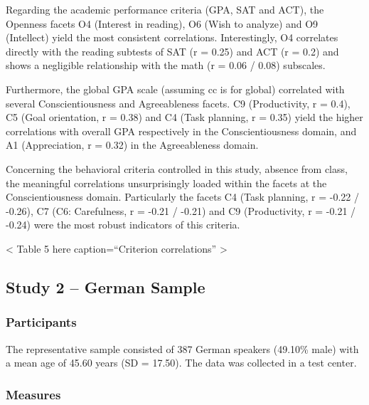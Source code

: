 \documentclass[,man,floatsintext]{apa6}
\theoremstyle{definition}
\theoremstyle{definition}
\theoremstyle{definition}
\theoremstyle{remark}
\begin{document}
Regarding the academic performance criteria (GPA, SAT and ACT), the
Openness facets O4 (Interest in reading), O6 (Wish to analyze) and O9
(Intellect) yield the most consistent correlations. Interestingly, O4
correlates directly with the reading subtests of SAT (r = 0.25) and ACT
(r = 0.2) and shows a negligible relationship with the math (r = 0.06 /
0.08) subscales.

Furthermore, the global GPA scale (assuming cc is for global) correlated
with several Conscientiousness and Agreeableness facets. C9
(Productivity, r = 0.4), C5 (Goal orientation, r = 0.38) and C4 (Task
planning, r = 0.35) yield the higher correlations with overall GPA
respectively in the Conscientiousness domain, and A1 (Appreciation, r =
0.32) in the Agreeableness domain.

Concerning the behavioral criteria controlled in this study, absence
from class, the meaningful correlations unsurprisingly loaded within the
facets at the Conscientiousness domain. Particularly the facets C4 (Task
planning, r = -0.22 / -0.26), C7 (C6: Carefulness, r = -0.21 / -0.21)
and C9 (Productivity, r = -0.21 / -0.24) were the most robust indicators
of this criteria.

\vspace{5mm}

\textless{} Table 5 here caption=\enquote{Criterion correlations}
\textgreater{}

\vspace{5mm}

\hypertarget{study-2-german-sample}{%
\subsection{Study 2 -- German Sample}\label{study-2-german-sample}}

\hypertarget{participants-1}{%
\subsubsection{Participants}\label{participants-1}}

The representative sample consisted of 387 German speakers (49.10\%
male) with a mean age of 45.60 years (SD = 17.50). The data was
collected in a test center.

\hypertarget{measures-1}{%
\subsubsection{Measures}\label{measures-1}}
\end{document}
